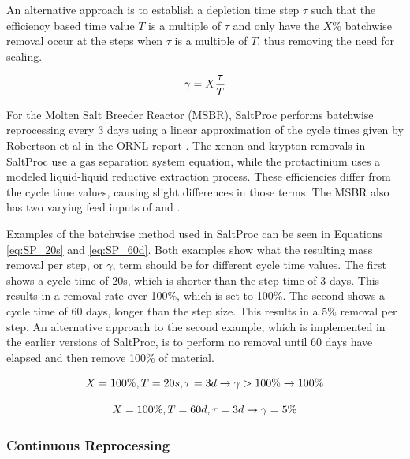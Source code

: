 An alternative approach is to establish a depletion time step $\tau$ such that the efficiency based time value $T$ is a multiple of $\tau$ and only have the $X\%$ batchwise removal occur at the steps when $\tau$ is a multiple of $T$, thus removing the need for scaling.

\begin{equation} \hfill 
\gamma = X \frac{\tau}{T}
\hfill\label{eq:batchwise_rem_eff} \end{equation}

For the Molten Salt Breeder Reactor (MSBR), SaltProc performs batchwise reprocessing every 3 days using a linear approximation of the cycle times given by Robertson et al in the ORNL report \cite{robertson_conceptual_1971, rykhlevskii_modeling_2019}. The xenon and krypton removals in SaltProc use a gas separation system equation, while the protactinium uses a modeled liquid-liquid reductive extraction process. These efficiencies differ from the cycle time values, causing slight differences in those terms. The MSBR also has two varying feed inputs of  and .

Examples of the batchwise method used in SaltProc can be seen in Equations \eqref{eq:SP_20s} and \eqref{eq:SP_60d}. Both examples show what the resulting mass removal per step, or $\gamma$, term should be for different cycle time values. The first shows a cycle time of 20s, which is shorter than the step time of 3 days. This results in a removal rate over 100\%, which is set to 100\%. The second shows a cycle time of 60 days, longer than the step size. This results in a 5\% removal per step. An alternative approach to the second example, which is implemented in the earlier versions of SaltProc, is to perform no removal until 60 days have elapsed and then remove 100\% of material.

\begin{equation} \hfill
X = 100\%, T = 20 s, \tau = 3 d \rightarrow \gamma > 100\% \rightarrow 100\% 
\hfill\label{eq:SP_20s} \end{equation}

\begin{equation} \hfill
X = 100\%, T = 60 d, \tau = 3 d \rightarrow \gamma = 5\%
\hfill\label{eq:SP_60d} \end{equation}

\subsubsection{Continuous Reprocessing}

